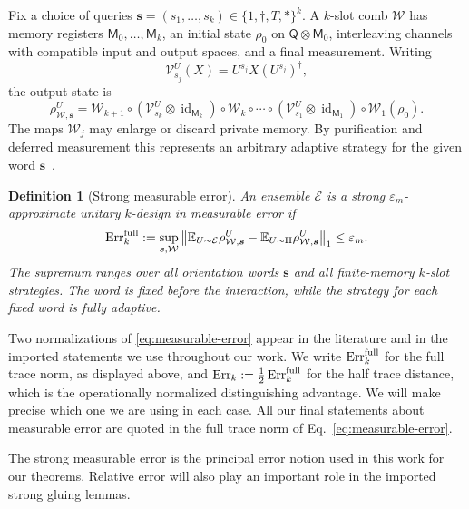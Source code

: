 \documentclass[
    aps,
    superscriptaddress,
    onecolumn,
    10pt,
    prx,
    nofootinbib
]{revtex4-2}
\newtheorem{definition}{Definition}
\newcommand{\Haar}{\mathrm H}
\newcommand{\E}{\mathbb E}
\newcommand{\cE}{\mathcal E}
\newcommand{\cW}{\mathcal W}
\theoremstyle{namedstatement}
\theoremstyle{plain}
\begin{document}
Fix a choice of queries \(\bm s=(s_1,\ldots,s_{k})\in\{1,\dagger,T,*\}^k\).  A \(k\)-slot comb \(\cW\) has memory registers \(\mathsf{M}_0,\ldots,\mathsf{M}_k\), an initial state \(\rho_0\) on \(\mathsf{Q}\otimes \mathsf{M}_0\), interleaving channels with compatible input and output spaces, and a final measurement.  Writing
\[
 \mathcal V_{s_j}^{U}(X)=U^{s_j}X(U^{s_j})^\dagger,
\]
the output state is
\begin{equation}\label{eq:comb-output}
 \rho_{\cW,\bm s}^{U}
 =\cW_{k+1}\circ(\mathcal V_{s_k}^{U}\otimes\operatorname{id}_{\mathsf{M}_k})
 \circ\cW_{k}\circ\cdots\circ
 (\mathcal V_{s_1}^{U}\otimes\operatorname{id}_{\mathsf{M}_1})
 \circ\cW_1(\rho_0).
\end{equation}
The maps \(\cW_j\) may enlarge or discard private memory. By purification and deferred measurement this represents an arbitrary adaptive strategy for the given word $\bm s$~\cite{ChiribellaEtAl2009}.

\begin{definition}[Strong measurable error]
An ensemble \(\cE\) is a strong \(\varepsilon_m\)-approximate unitary \(k\)-design in measurable error if
\begin{equation}\label{eq:measurable-error}
 \operatorname{Err}_{k}^{\rm full}:=\sup_{\bm s,\cW}
 \left\|
 \E_{U\sim\cE}\rho_{\cW,\bm s}^{U}
 -\E_{U\sim\Haar}\rho_{\cW,\bm s}^{U}
 \right\|_1\leq\varepsilon_m.
\end{equation}
The supremum ranges over all orientation words $\bm s$ and all finite-memory $k$-slot strategies. The word is fixed before the interaction, while the strategy for each fixed word is fully adaptive.
\end{definition}

Two normalizations of \cref{eq:measurable-error} appear in the literature and in the imported statements we use throughout our work. We write $ \operatorname{Err}_{k}^{\rm full}$ for the full trace norm, as displayed
above, and  $\operatorname{Err}_{k} :=\frac{1}{2}  \operatorname{Err}_{k}^{\rm full}$ for the half trace distance, which is the operationally normalized
distinguishing advantage. We will make precise which one we are using in each case. All our final statements about measurable error are quoted in the full trace norm of Eq.~\eqref{eq:measurable-error}. 





The strong measurable error is the principal error notion used in this work for our theorems. Relative error will also play an important role in the imported strong gluing lemmas.
\end{document}
